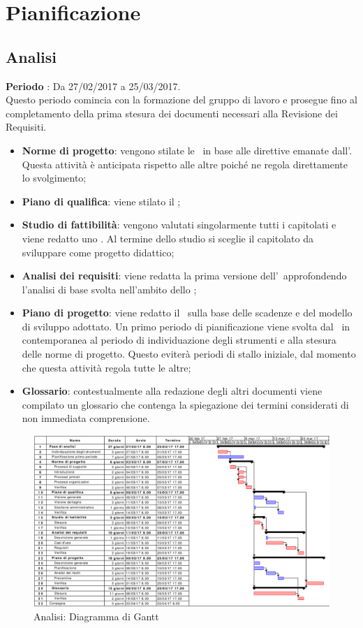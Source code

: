 \documentclass[../PianoDiProgetto.tex]{subfiles}
\begin{document}
	\section{Pianificazione}
	
		\subsection{Analisi}
		\textbf{Periodo} : Da 27/02/2017 a 25/03/2017. \\
		Questo periodo comincia con la formazione del gruppo di lavoro e prosegue fino al completamento della prima stesura dei documenti necessari alla Revisione dei Requisiti.
		\begin{itemize}
			\item \textbf{Norme di progetto}: vengono stilate le \normediprogetto\ in base alle direttive emanate dall'\amministratore. Questa attività è anticipata rispetto alle altre poiché ne regola direttamente lo svolgimento;
			\item \textbf{Piano di qualifica}: viene stilato il  \pianodiqualifica ;
			\item \textbf{Studio di fattibilità}: vengono valutati singolarmente tutti i capitolati e viene redatto uno \studiodifattibilita. Al termine dello studio si sceglie il capitolato da sviluppare come progetto didattico;
			\item \textbf{Analisi dei requisiti}: viene redatta la prima versione dell'\analisideirequisiti\ approfondendo l'analisi di base svolta nell'ambito dello \studiodifattibilita ;
			\item \textbf{Piano di progetto}: viene redatto il \pianodiprogetto\ sulla base delle scadenze e del modello di sviluppo adottato. Un primo periodo di pianificazione viene svolta dal \responsabilediprogetto\ in contemporanea al periodo di individuazione degli strumenti e alla stesura delle norme di progetto. Questo eviterà periodi di stallo iniziale, dal momento che questa attività regola tutte le altre;
			\item \textbf{Glossario}: contestualmente alla redazione degli altri documenti viene compilato un glossario che contenga la spiegazione dei termini considerati di non immediata comprensione.
		\end{itemize}
		\begin{figure}[H]
			\centering
			\includegraphics[scale=0.55]{Figures/Gantt_Analisi.jpg}
			\caption{Analisi: Diagramma di Gantt}
		\end{figure}
			
\end{document}

